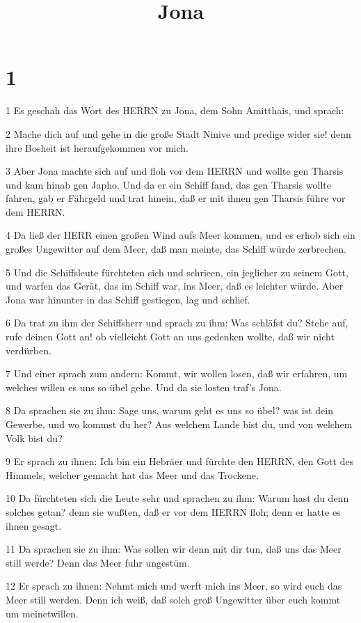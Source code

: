 

\title{Jona}


\chapter{1}

\par 1 Es geschah das Wort des HERRN zu Jona, dem Sohn Amitthais, und sprach:
\par 2 Mache dich auf und gehe in die große Stadt Ninive und predige wider sie! denn ihre Bosheit ist heraufgekommen vor mich.
\par 3 Aber Jona machte sich auf und floh vor dem HERRN und wollte gen Tharsis und kam hinab gen Japho. Und da er ein Schiff fand, das gen Tharsis wollte fahren, gab er Fährgeld und trat hinein, daß er mit ihnen gen Tharsis führe vor dem HERRN.
\par 4 Da ließ der HERR einen großen Wind aufs Meer kommen, und es erhob sich ein großes Ungewitter auf dem Meer, daß man meinte, das Schiff würde zerbrechen.
\par 5 Und die Schiffsleute fürchteten sich und schrieen, ein jeglicher zu seinem Gott, und warfen das Gerät, das im Schiff war, ins Meer, daß es leichter würde. Aber Jona war hinunter in das Schiff gestiegen, lag und schlief.
\par 6 Da trat zu ihm der Schiffsherr und sprach zu ihm: Was schläfst du? Stehe auf, rufe deinen Gott an! ob vielleicht Gott an uns gedenken wollte, daß wir nicht verdürben.
\par 7 Und einer sprach zum andern: Kommt, wir wollen losen, daß wir erfahren, um welches willen es uns so übel gehe. Und da sie losten traf's Jona.
\par 8 Da sprachen sie zu ihm: Sage uns, warum geht es uns so übel? was ist dein Gewerbe, und wo kommst du her? Aus welchem Lande bist du, und von welchem Volk bist du?
\par 9 Er sprach zu ihnen: Ich bin ein Hebräer und fürchte den HERRN, den Gott des Himmels, welcher gemacht hat das Meer und das Trockene.
\par 10 Da fürchteten sich die Leute sehr und sprachen zu ihm: Warum hast du denn solches getan? denn sie wußten, daß er vor dem HERRN floh; denn er hatte es ihnen gesagt.
\par 11 Da sprachen sie zu ihm: Was sollen wir denn mit dir tun, daß uns das Meer still werde? Denn das Meer fuhr ungestüm.
\par 12 Er sprach zu ihnen: Nehmt mich und werft mich ins Meer, so wird euch das Meer still werden. Denn ich weiß, daß solch groß Ungewitter über euch kommt um meinetwillen.

